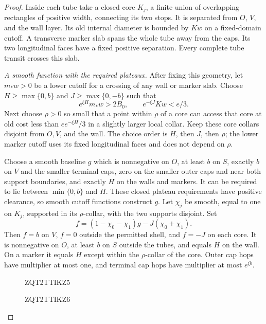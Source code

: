 \documentclass[11pt]{article}
\numberwithin{equation}{section}
\theoremstyle{definition}
\theoremstyle{remark}
\newcommand{\1}{\mathbf 1}
\begin{document}
\begin{proof}
Inside each tube take a closed core $K_j$, a finite union of
overlapping rectangles of positive width, connecting its two stops.
It is separated from $O$, $V$, and the wall layer.  Its old internal
diameter is bounded by $Kw$ on a fixed-domain cutoff.  A transverse
marker slab spans the whole tube away from the caps.  Its two
longitudinal faces have a fixed positive separation.  Every complete
tube transit crosses this slab.

\emph{A smooth function with the required plateaux.}
After fixing this geometry, let $m_*w>0$ be a lower cutoff for a
crossing of any wall or marker slab.  Choose $H\geq\max\{0,b\}$ and
$J\geq\max\{0,-b\}$ such that
\[
 e^{\xi H}m_*w>2B_0,
 \qquad e^{-\xi J}Kw<e/3.
\]
Next choose $\rho>0$ so small that a point within $\rho$ of a core
can access that core at old cost less than $e e^{-\xi H}/3$ in a
slightly larger local collar.  Keep these core collars disjoint from
$O,V$, and the wall.  The choice order is $H$, then $J$, then
$\rho$; the lower marker cutoff uses its fixed longitudinal faces
and does not depend on $\rho$.

Choose a smooth baseline $g$ which is nonnegative on $O$, at least
$b$ on $S$, exactly $b$ on $V$ and the smaller terminal caps, zero
on the smaller outer caps and near both support boundaries, and
exactly $H$ on the walls and markers.  It can be required to lie
between $\min\{0,b\}$ and $H$.  These closed plateau requirements
have positive clearance, so smooth cutoff functions construct $g$.
Let $\chi_j$ be smooth, equal to one on $K_j$, supported in its
$\rho$-collar, with the two supports disjoint.  Set
\begin{equation}
 f=(1-\chi_0-\chi_1)g-J(\chi_0+\chi_1).
 \label{met:gate-function}
\end{equation}
Then $f=b$ on $V$, $f=0$ outside the permitted shell, and $f=-J$
on each core.  It is nonnegative on $O$, at least $b$ on $S$ outside
the tubes, and equals $H$ on the wall.  On a marker it equals $H$
except within the $\rho$-collar of the core.  Outer cap hops have
multiplier at most one, and terminal cap hops have multiplier at
most $e^{\xi b}$.

\begin{figure}[htbp]

\begingroup
{}
ZQT2TTIKZ5

\par 
ZQT2TTIKZ6


\end{figure}
\end{proof}
\end{document}
